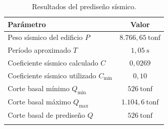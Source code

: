 \begin{table}[H]
    \centering
    \caption{Resultados del prediseño sísmico.}
    \label{tab:resumen_prediseno}
    \begin{tabular}{lc}
        \toprule
        \textbf{Parámetro}                                  & \textbf{Valor} \\
        \midrule
        Peso sísmico del edificio $P$                       & $8{.}766{,}65\ \text{tonf}$ \\
        Período aproximado $T$                              & $1{,}05\ \text{s}$ \\
        Coeficiente sísmico calculado $C$                   & $0{,}0269$ \\
        Coeficiente sísmico utilizado $C_{\min}$            & $0{,}10$ \\
        Corte basal mínimo $Q_{\min}$                       & $526\ \text{tonf}$ \\
        Corte basal máximo $Q_{\max}$                       & $1{.}104{,}6\ \text{tonf}$ \\
        Corte basal de prediseño $Q$                        & $526\ \text{tonf}$ \\
        \bottomrule
        \vspace{0.001cm}
    \end{tabular}
    
\end{table}